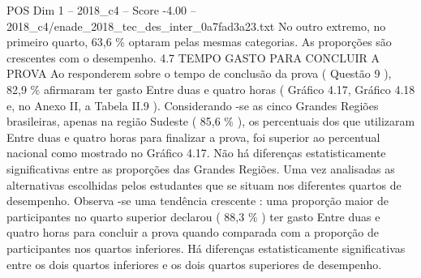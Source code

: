 \begin{textsample}{POS Dim 1 – 2018\_c4 – Score -4.00 – 2018\_c4/enade\_2018\_tec\_des\_inter\_0a7fad3a23.txt}
No outro extremo, no primeiro quarto, 63,6 \% optaram pelas mesmas categorias.
As proporções são crescentes com o desempenho. 4.7 TEMPO GASTO PARA CONCLUIR A PROVA Ao responderem sobre o tempo de conclusão da prova ( Questão 9 ), 82,9 \% afirmaram ter gasto Entre duas e quatro horas ( Gráfico 4.17, Gráfico 4.18 e, no Anexo II, a Tabela II.9 ).
Considerando -se as cinco Grandes Regiões brasileiras, apenas na região Sudeste ( 85,6 \% ), os percentuais dos que utilizaram Entre duas e quatro horas para finalizar a prova, foi superior ao percentual nacional como mostrado no Gráfico 4.17.
Não há diferenças estatisticamente significativas entre as proporções das Grandes Regiões.
Uma vez analisadas as alternativas escolhidas pelos estudantes que se situam nos diferentes quartos de desempenho.
Observa -se uma tendência crescente : uma proporção maior de participantes no quarto superior declarou ( 88,3 \% ) ter gasto Entre duas e quatro horas para concluir a prova quando comparada com a proporção de participantes nos quartos inferiores.
Há diferenças estatisticamente significativas entre os dois quartos inferiores e os dois quartos superiores de desempenho.

\end{textsample}
